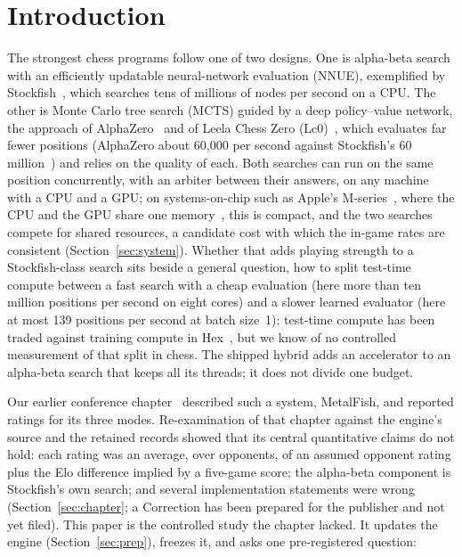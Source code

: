 \documentclass{article}
\newif\ifanon
\newcommand{\MF}{MetalFish}
\begin{document}

\section{Introduction}
\label{sec:intro}

The strongest chess programs follow one of two designs. One is alpha-beta search with an efficiently updatable neural-network evaluation (NNUE), exemplified by Stockfish~\cite{stockfish,nasu2018,sf12}, which searches tens of millions of nodes per second on a CPU. The other is Monte Carlo tree search (MCTS) guided by a deep policy--value network, the approach of AlphaZero~\cite{silver2018} and of Leela Chess Zero (Lc0)~\cite{lc0,monroe2026}, which evaluates far fewer positions (AlphaZero about 60{,}000 per second against Stockfish's 60 million~\cite{silver2018}) and relies on the quality of each. Both searches can run on the same position concurrently, with an arbiter between their answers, on any machine with a CPU and a GPU; on systems-on-chip such as Apple's M-series~\cite{applem2}, where the CPU and the GPU share one memory~\cite{appleunified}, this is compact, and the two searches compete for shared resources, a candidate cost with which the in-game rates are consistent (Section~\ref{sec:system}). Whether that adds playing strength to a Stockfish-class search sits beside a general question, how to split test-time compute between a fast search with a cheap evaluation (here more than ten million positions per second on eight cores) and a slower learned evaluator (here at most 139 positions per second at batch size~1); test-time compute has been traded against training compute in Hex~\cite{jones2021}, but we know of no controlled measurement of that split in chess. The shipped hybrid adds an accelerator to an alpha-beta search that keeps all its threads; it does not divide one budget.

\ifanon An earlier conference chapter~\cite{niketan2026chapter} described such a system, \MF{}, and reported ratings for its three modes. Re-examination of that chapter\else Our earlier conference chapter~\cite{niketan2026chapter} described such a system, \MF{}, and reported ratings for its three modes. Re-examination of that chapter\fi{} against the engine's source and the retained records showed that its central quantitative claims do not hold: each rating was an average, over opponents, of an assumed opponent rating plus the Elo difference implied by a five-game score; the alpha-beta component is Stockfish's own search; and several implementation statements were wrong (Section~\ref{sec:chapter}\ifanon\else; a Correction has been prepared for the publisher and not yet filed\fi). This paper is the controlled study the chapter lacked. It updates the engine (Section~\ref{sec:prep}), freezes it, and asks one pre-registered question:
\end{document}
